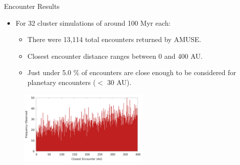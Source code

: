 \documentclass{beamer}
\begin{document}
\begin{frame}{Encounter Results}
    \begin{itemize}
        \item For 32 cluster simulations of around 100 Myr each: 
            \begin{itemize}
                \item There were 13,114 total encounters returned by AMUSE.
                \item Closest encounter distance ranges between 0 and 400 AU.
                \item Just under 5.0 \% of encounters are close enough to be
                    considered for planetary encounters ($<$ 30 AU).
            \end{itemize}
    \end{itemize}
    \begin{figure}
        \center
        \includegraphics[width=2.5in]{encounter_distance_frequency}
    \end{figure}
\end{frame}
\end{document}
